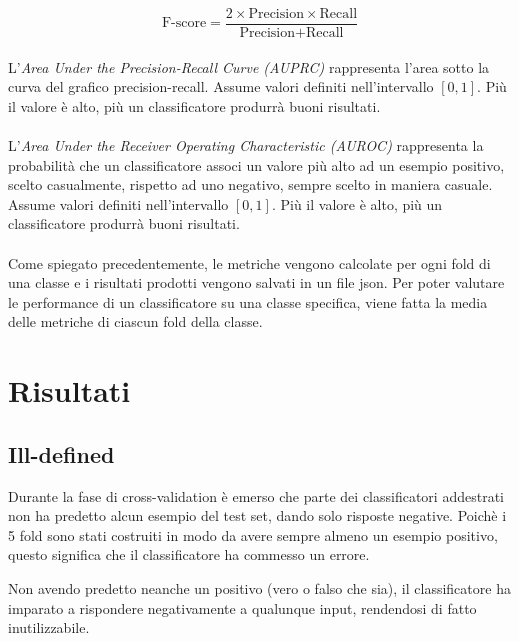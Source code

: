 \documentclass[12pt,a4paper,oneside,hidelinks]{report}
\begin{document}
\begin{equation}
\text{F-score} = \frac{2 \times \text{Precision} \times \text{Recall}}{\text{Precision} + \text{Recall}}
\end{equation}

\paragraph*{}
L'\textit{Area Under the Precision-Recall Curve (AUPRC)} rappresenta l'area sotto la curva del grafico precision-recall. Assume valori definiti nell'intervallo $[0,1]$. Più il valore è alto, più un classificatore produrrà buoni risultati.

\paragraph*{}
L'\textit{Area Under the Receiver Operating Characteristic (AUROC)} rappresenta la probabilità che un classificatore associ un valore più alto ad un esempio positivo, scelto casualmente, rispetto ad uno negativo, sempre scelto in maniera casuale. Assume valori definiti nell'intervallo $[0,1]$. Più il valore è alto, più un classificatore produrrà buoni risultati.

\paragraph*{}
Come spiegato precedentemente, le metriche vengono calcolate per ogni fold di una classe e i risultati prodotti vengono salvati in un file json. Per poter valutare le performance di un classificatore su una classe specifica, viene fatta la media delle metriche di ciascun fold della classe.

\section{Risultati}

\subsection{Ill-defined}
Durante la fase di cross-validation è emerso che parte dei classificatori addestrati non ha predetto alcun esempio del test set, dando solo risposte negative. Poichè i 5 fold sono stati costruiti in modo da avere sempre almeno un esempio positivo, questo significa che il classificatore ha commesso un errore.

Non avendo predetto neanche un positivo (vero o falso che sia), il classificatore ha imparato a rispondere negativamente a qualunque input, rendendosi di fatto inutilizzabile.
\end{document}
